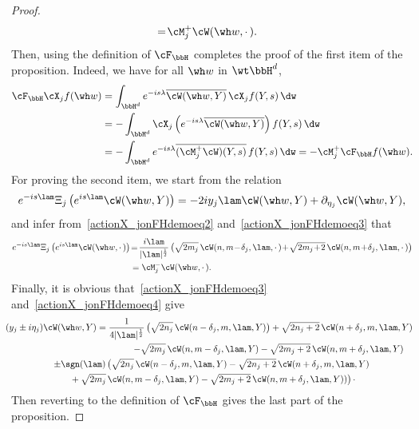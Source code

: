 \begin{proof}
\[\begin{aligned}
&\! =\! \cM_j^+\cW(\wh w,{\cdot\,}).
\end{aligned}
\]
Then, using the definition of $\cF_\bbH$ completes the proof of the first item of the proposition. Indeed, we have for all $\wh w$ in $\wt\bbH^d$,
\[
\begin{aligned}
\cF_\bbH\cX_jf(\wh w)&=\int_{\bbH^d}e^{-is\lambda}\overline{\cW(\wh w,Y)}\,\cX_jf(Y,s)\,\dw\\
&=-\int_{\bbH^d}\cX_j\left(e^{-is\lambda}\overline{\cW(\wh w,Y)}\right)f(Y,s)\,\dw\\
&=-\int_{\bbH^d}e^{-is\lambda}\overline{(\cM_j^+\cW)(Y,s)}\,f(Y,s)\,\dw= -\cM_j^+\cF_\bbH f(\wh w).
\end{aligned}
\]
For proving the second item, we start from the relation
\[
e^{-is\lam} \Xi_j\left(e^{is\lam}\cW(\wh w,Y) \right) = -2iy_j \lam\cW(\wh w,Y) +\partial_{\eta_j} \cW(\wh w,Y),
\]
and infer from~\eqref{actionX_jonFHdemoeq2} and~\eqref{actionX_jonFHdemoeq3} that
\[
\begin{aligned}
e^{-is\lam} \Xi_j\left(e^{is\lam}\cW(\wh w,{\cdot\,}) \right) & \!=\! \frac {i\lam} {|\lam|^{\frac 12}} \left(\sqrt {2m_j} \,\cW(n,m\!-\!\delta_j,\lam,{\cdot\,})\!+\! \sqrt {2m_j\!+\!2} \,\cW(n,m\!+\!\delta_j,\lam,{\cdot\,})\right)\\
& = \cM_j^-\cW(\wh w,{\cdot\,}).
\end{aligned}
\]
Finally, it is obvious that~\eqref{actionX_jonFHdemoeq3} and~\eqref{actionX_jonFHdemoeq4} give
\begin{multline*}
\!\!\!\!(y_j\pm i\eta_j) \cW(\wh w,Y) = \frac1{4|\lam|^{\frac 12}}\left(\sqrt {2n_j}\,\cW(n-\delta_j,m,\lam,Y)\right) +\sqrt {2n_j+2}\,\cW(n+\delta_j,m,\lam,Y)\\
\shoveright{-\sqrt {2m_j}\, \cW(n,m-\delta_j,\lam,Y) - \sqrt {2m_j+2}\,\cW(n,m+\delta_j,\lam,Y)}
\\ \pm\sgn (\lam)
\left(\sqrt {2n_j}\,\cW(n-\delta_j,m,\lam,Y)-\sqrt {2n_j+2}\,\cW(n+\delta_j,m,\lam,Y)\right.\\
\left.{} +\sqrt {2m_j}\,\cW(n,m-\delta_j,\lam,Y)-\sqrt {2m_j+2}\,\cW(n,m+\delta_j,\lam,Y)) \right)\cdotp
\end{multline*}
Then reverting to the definition of $\cF_\bbH$ gives the last part of the proposition.
\end{proof}

